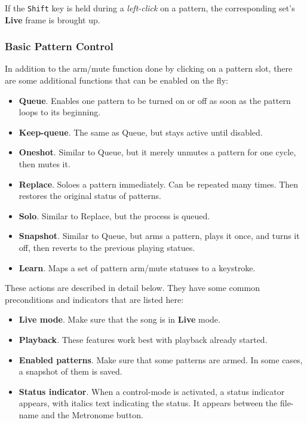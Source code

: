    If the \texttt{Shift} key is held during a
   \textsl{left-click} on a pattern,
   the corresponding set's \textbf{Live} frame is brought up.

\subsubsection{Basic Pattern Control}
\label{subsubsec:patterns_basic_pattern_control}

   In addition to the arm/mute function done by clicking on a pattern slot,
   there are some additional functions that can be enabled on the fly:

   \begin{itemize}
      \item \textbf{Queue}.
         Enables one pattern to be turned on or off as soon as the pattern
         loops to its beginning.
      \item \textbf{Keep-queue}.
         The same as Queue, but stays active until disabled.
      \item \textbf{Oneshot}.
         Similar to Queue, but it merely unmutes a pattern for one cycle,
         then mutes it.
      \item \textbf{Replace}.
         Soloes a pattern immediately.
         Can be repeated many times.
         Then restores the original status of patterns.
      \item \textbf{Solo}.
         Similar to Replace, but the process is queued.
      \item \textbf{Snapshot}.
         Similar to Queue, but arms a pattern, plays it once, and turns it
         off, then reverts to the previous playing statues.
      \item \textbf{Learn}.
         Maps a set of pattern arm/mute statuses to a keystroke.
   \end{itemize}

   These actions are described in detail below.
   They have some common preconditions and indicators that are listed here:

   \begin{itemize}
      \item \textbf{Live mode}.
         Make sure that the song is in \textbf{Live} mode.
      \item \textbf{Playback}.
         These features work best with playback already started.
      \item \textbf{Enabled patterns}.
         Make sure that some patterns are armed.
         In some cases, a snapshot of them is saved.
      \item \textbf{Status indicator}.
         When a control-mode is activated, a status indicator appears, with
         italics text indicating the status. It appears between the
         file-name and the Metronome button.
   \end{itemize}

